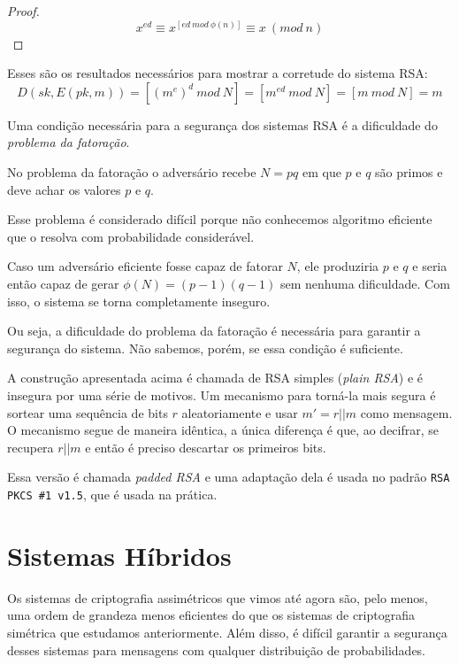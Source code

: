 \begin{proof}
  \begin{displaymath}
    x^{ed} \equiv x^{[ed\ mod\ \phi(n)]} \equiv x\ (mod\ n)
  \end{displaymath}
\end{proof}

Esses são os resultados necessários para mostrar a corretude do sistema RSA:
\begin{displaymath}
D(sk, E(pk, m)) = [(m^e)^d\ mod\ N] = [m^{ed}\ mod\ N] = [m\ mod\ N] = m
\end{displaymath}

Uma condição necessária para a segurança dos sistemas RSA é a dificuldade do {\em problema da fatoração}.

No problema da fatoração o adversário recebe $N = pq$ em que $p$ e $q$ são primos e deve achar os valores $p$ e $q$.

Esse problema é considerado difícil porque não conhecemos algoritmo eficiente que o resolva com probabilidade considerável.

Caso um adversário eficiente fosse capaz de fatorar $N$, ele produziria $p$ e $q$ e seria então capaz de gerar $\phi(N) = (p-1)(q-1)$ sem nenhuma dificuldade.
Com isso, o sistema se torna completamente inseguro.

Ou seja, a dificuldade do problema da fatoração é necessária para garantir a segurança do sistema. 
Não sabemos, porém, se essa condição é suficiente.

A construção apresentada acima é chamada de RSA simples ({\em plain RSA}) e é insegura por uma série de motivos.
Um mecanismo para torná-la mais segura é sortear uma sequência de bits $r$ aleatoriamente e usar $m' = r||m$ como mensagem.
O mecanismo segue de maneira idêntica, a única diferença é que, ao decifrar, se recupera $r||m$ e então é preciso descartar os primeiros bits.

Essa versão é chamada {\em padded RSA} e uma adaptação dela é usada no padrão {\tt RSA PKCS \#1 v1.5}, que é usada na prática.


\section{Sistemas Híbridos}
\label{sec:sistemas-hibridos}


Os sistemas de criptografia assimétricos que vimos até agora são, pelo menos, uma ordem de grandeza menos eficientes do que os sistemas de criptografia simétrica que estudamos anteriormente.
Além disso, é difícil garantir a segurança desses sistemas para mensagens com qualquer distribuição de probabilidades.

